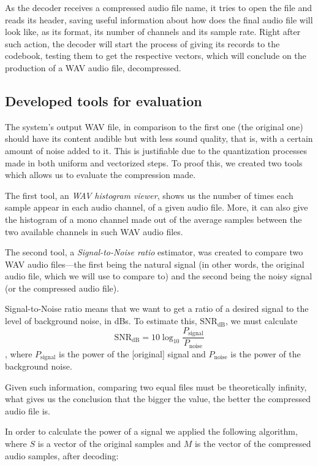 \documentclass[conference]{IEEEtran}
\begin{document}
As the decoder receives a compressed audio file name, it tries to open the file and reads its header, saving useful information about how does the final audio file will look like, as its format, its number of channels and its sample rate. Right after such action, the decoder will start the process of giving its records to the codebook, testing them to get the respective vectors, which will conclude on the production of a \ac{WAV} audio file, decompressed.

\subsection{Developed tools for evaluation}

The system's output \ac{WAV} file, in comparison to the first one (the original one) should have its content audible but with less sound quality, that is, with a certain amount of noise added to it. This is justifiable due to the quantization processes made in both uniform and vectorized steps. To proof this, we created two tools which allows us to evaluate the compression made. 

The first tool, an \emph{\ac{WAV} histogram viewer}, shows us the number of times each sample appear in each audio channel, of a given audio file. More, it can also give the histogram of a mono channel made out of the average samples between the two available channels in such \ac{WAV} audio files.

The second tool, a \emph{Signal-to-Noise ratio} estimator, was created to compare two \ac{WAV} audio files—the first being the natural signal (in other words, the original audio file, which we will use to compare to) and the second being the noisy signal (or the compressed audio file). 

Signal-to-Noise ratio means that we want to get a ratio of a desired signal to the level of background noise, in \acp{dB}. To estimate this, $\text{SNR}_\text{dB}$, we must calculate $$\text{SNR}_\text{dB}=10\log_{10}{\frac{P_{\text{signal}}}{P_{\text{noise}}}}$$, where $P_{\text{signal}}$ is the power of the [original] signal and $P_{\text{noise}}$ is the power of the background noise.

Given such information, comparing two equal files must be theoretically infinity, what gives us the conclusion that the bigger the value, the better the compressed audio file is.

In order to calculate the power of a signal we applied the following algorithm, where $S$ is a vector of the original samples and $M$ is the vector of the compressed audio samples, after decoding:
\end{document}
